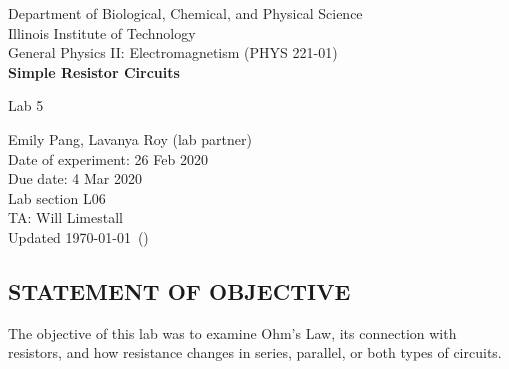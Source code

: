 \documentclass [12pt, letterpaper, twoside] {article}
\begin{document}
\begin {titlepage}
\begin {center}
Department of Biological, Chemical, and Physical Science\\
\vspace {0.1cm}
Illinois Institute of Technology\\
\vspace {0.1cm}
General Physics II: Electromagnetism (PHYS 221-01)\\
\vspace* {\fill}
\begingroup
\Large
\textbf {Simple Resistor Circuits}
\vspace {0.35cm}

\normalsize
Lab 5 
\vspace {1.5cm}
\endgroup
\vspace* {\fill}
\end {center}

\vspace*{\fill}
\begin {flushright}
\footnotesize
Emily Pang, Lavanya Roy (lab partner) \\
Date of experiment: 26 Feb 2020 \\
Due date: 4 Mar 2020 \\
Lab section L06 \\
TA: Will Limestall \\
Updated \usdate\today~(\currenttime)
\end {flushright}
\end {titlepage}
\subsection* {STATEMENT OF OBJECTIVE}
The objective of this lab was to examine Ohm's Law, its connection with resistors, and how resistance changes in series, parallel, or both types of circuits. \\
\end{document}

